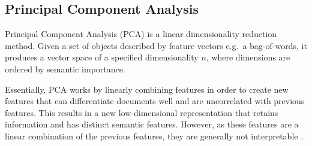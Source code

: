 
%




\subsection{Principal Component Analysis}\label{ch2:PCA}









Principal Component Analysis (PCA) is a linear dimensionality reduction method. Given a set of objects described by feature vectors e.g.\  a bag-of-words, it produces a vector space of a specified dimensionality $n$, where dimensions are  ordered by semantic importance. 

Essentially, PCA works by linearly combining features in order to create new features that can differentiate documents well and are uncorrelated with previous features. This results in a new low-dimensional representation that retains information and has distinct semantic features. However, as these features are a linear combination of the previous features, they are generally not interpretable \cite{Gimenez}. 



